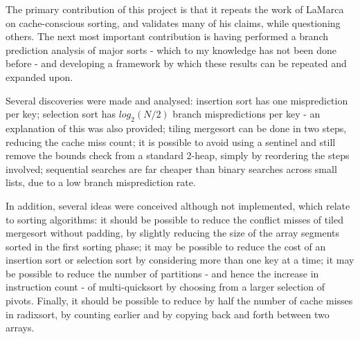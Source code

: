 The primary contribution of this project is that it repeats the work of LaMarca
on cache-conscious sorting, and validates many of his claims, while questioning
others. The next most important contribution is having performed a branch
prediction analysis of major sorts - which to my knowledge has not been done
before - and developing a framework by which these results can be repeated and
expanded upon.


Several discoveries were made and analysed: insertion sort has one misprediction
per key; selection sort has $log_2(N/2)$ branch mispredictions per key - an
explanation of this was also provided; tiling mergesort can be done in two
steps, reducing the cache miss count; it is possible to avoid using a
sentinel and still remove the bounds check from a standard 2-heap, simply by
reordering the steps involved; sequential searches are far cheaper than binary
searches across small lists, due to a low branch misprediction rate.



In addition, several ideas were conceived although not implemented, which relate
to sorting algorithms: it should be possible to reduce the conflict misses of
tiled mergesort without padding, by slightly reducing the size of the array
segments sorted in the first sorting phase; it may be possible to reduce the
cost of an insertion sort or selection sort by considering more than one key at
a time; it may be possible to reduce the number of partitions - and hence the
increase in instruction count - of multi-quicksort by choosing from a larger
selection of pivots. Finally, it should be possible to reduce by half the number
of cache misses in radixsort, by counting earlier and by copying back and forth
between two arrays.
